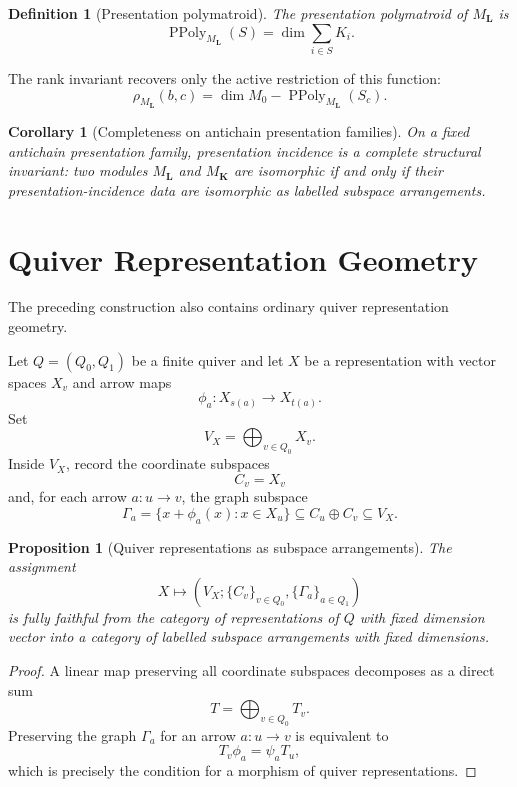 \documentclass[11pt]{article}
\newtheorem{proposition}[theorem]{Proposition}
\newtheorem{corollary}[theorem]{Corollary}
\newtheorem{definition}[theorem]{Definition}
\begin{document}
\begin{definition}[Presentation polymatroid]
The presentation polymatroid of \(M_{\mathbf L}\) is
\[
\operatorname{PPoly}_{M_{\mathbf L}}(S)
=
\dim\sum_{i\in S}K_i.
\]
\end{definition}

The rank invariant recovers only the active restriction of this function:
\[
\rho_{M_{\mathbf L}}(b,c)
=
\dim M_0-\operatorname{PPoly}_{M_{\mathbf L}}(S_c).
\]

\begin{corollary}[Completeness on antichain presentation families]
On a fixed antichain presentation family, presentation incidence is a complete structural invariant: two modules \(M_{\mathbf L}\) and \(M_{\mathbf K}\) are isomorphic if and only if their presentation-incidence data are isomorphic as labelled subspace arrangements.
\end{corollary}

\section{Quiver Representation Geometry}

The preceding construction also contains ordinary quiver representation geometry.

Let \(Q=(Q_0,Q_1)\) be a finite quiver and let \(X\) be a representation with vector spaces \(X_v\) and arrow maps
\[
\phi_a:X_{s(a)}\to X_{t(a)}.
\]
Set
\[
V_X=\bigoplus_{v\in Q_0}X_v.
\]
Inside \(V_X\), record the coordinate subspaces
\[
C_v=X_v
\]
and, for each arrow \(a:u\to v\), the graph subspace
\[
\Gamma_a=\{x+\phi_a(x):x\in X_u\}
\subseteq C_u\oplus C_v
\subseteq V_X.
\]

\begin{proposition}[Quiver representations as subspace arrangements]
The assignment
\[
X\longmapsto (V_X;\{C_v\}_{v\in Q_0},\{\Gamma_a\}_{a\in Q_1})
\]
is fully faithful from the category of representations of \(Q\) with fixed dimension vector into a category of labelled subspace arrangements with fixed dimensions.
\end{proposition}

\begin{proof}
A linear map preserving all coordinate subspaces decomposes as a direct sum
\[
T=\bigoplus_{v\in Q_0}T_v.
\]
Preserving the graph \(\Gamma_a\) for an arrow \(a:u\to v\) is equivalent to
\[
T_v\phi_a=\psi_a T_u,
\]
which is precisely the condition for a morphism of quiver representations.
\end{proof}
\end{document}
